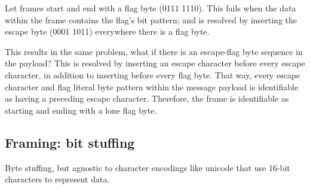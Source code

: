 Let frames start and end with a flag byte (0111 1110). This fails when the data within the frame contains the flag's bit pattern; and is resolved by inserting the escape byte (0001 1011) everywhere there is a flag byte. 

This results in the same problem, what if there is an escape-flag byte sequence in the payload? This is resolved by inserting an escape character before every escape character, in addition to inserting before every flag byte. That way, every escape character and flag literal byte pattern within the message payload is identifiable as having a preceding escape character. Therefore, the frame is identifiable as starting and ending with a lone flag byte.

\subsection{Framing: bit stuffing}

Byte stuffing, but agnostic to character encodings like unicode that use 16-bit characters to represent data. 

